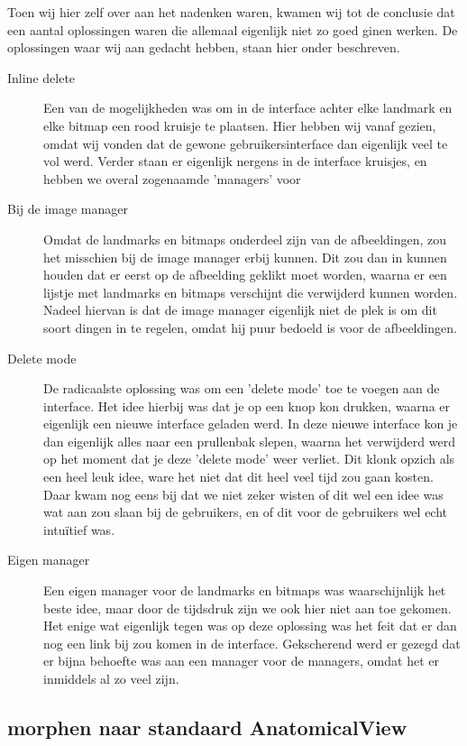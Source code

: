 Toen wij hier zelf over aan het nadenken waren, kwamen wij tot de conclusie dat een aantal oplossingen waren die allemaal eigenlijk niet zo goed ginen werken.
De oplossingen waar wij aan gedacht hebben, staan hier onder beschreven.
\begin{description}
  \item[Inline delete] Een van de mogelijkheden was om in de interface achter elke landmark en elke bitmap een rood kruisje te plaatsen.
  Hier hebben wij vanaf gezien, omdat wij vonden dat de gewone gebruikersinterface dan eigenlijk veel te vol werd.
  Verder staan er eigenlijk nergens in de interface kruisjes, en hebben we overal zogenaamde 'managers' voor
  \item[Bij de image manager] Omdat de landmarks en bitmaps onderdeel zijn van de afbeeldingen, zou het misschien bij de image manager erbij kunnen.
  Dit zou dan in kunnen houden dat er eerst op de afbeelding geklikt moet worden, waarna er een lijstje met landmarks en bitmaps verschijnt die verwijderd kunnen worden.
  Nadeel hiervan is dat de image manager eigenlijk niet de plek is om dit soort dingen in te regelen, omdat hij puur bedoeld is voor de afbeeldingen.
  \item[Delete mode]De radicaalste oplossing was om een 'delete mode' toe te voegen aan de interface.
  Het idee hierbij was dat je op een knop kon drukken, waarna er eigenlijk een nieuwe interface geladen werd.
  In deze nieuwe interface kon je dan eigenlijk alles naar een prullenbak slepen, waarna het verwijderd werd op het moment dat je deze 'delete mode' weer verliet.
  Dit klonk opzich als een heel leuk idee, ware het niet dat dit heel veel tijd zou gaan kosten.
  Daar kwam nog eens bij dat we niet zeker wisten of dit wel een idee was wat aan zou slaan bij de gebruikers, en of dit voor de gebruikers wel echt intu\"{i}tief was.
  \item[Eigen manager] Een eigen manager voor de landmarks en bitmaps was waarschijnlijk het beste idee, maar door de tijdsdruk zijn we ook hier niet aan toe gekomen.
  Het enige wat eigenlijk tegen was op deze oplossing was het feit dat er dan nog een link bij zou komen in de interface.
  Gekscherend werd er gezegd dat er bijna behoefte was aan een manager voor de managers, omdat het er inmiddels al zo veel zijn.
\end{description}

\subsection{morphen naar standaard AnatomicalView}

